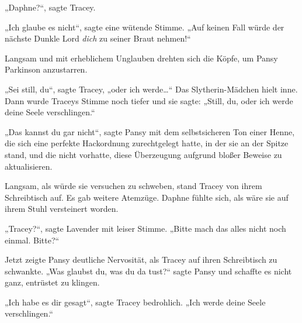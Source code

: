„Daphne?“, sagte Tracey.

„Ich glaube es nicht“, sagte eine wütende Stimme.
„Auf keinen Fall würde der nächste Dunkle Lord \emph{dich} zu seiner Braut nehmen!“

Langsam und mit erheblichem Unglauben drehten sich die Köpfe, um Pansy Parkinson anzustarren.

„Sei still, du“, sagte Tracey, „oder ich werde…“ Das Slytherin-Mädchen hielt inne. Dann wurde Traceys Stimme noch tiefer und sie sagte:
„Still, du, oder ich werde deine Seele verschlingen.“

„Das kannst du gar nicht“, sagte Pansy mit dem selbstsicheren Ton einer Henne, die sich eine perfekte Hackordnung zurechtgelegt hatte, in der sie an der Spitze stand, und die nicht vorhatte, diese Überzeugung aufgrund bloßer Beweise zu aktualisieren.

Langsam, als würde sie versuchen zu schweben, stand Tracey von ihrem Schreibtisch auf. Es gab weitere Atemzüge. Daphne fühlte sich, als wäre sie auf ihrem Stuhl versteinert worden.

„Tracey?“, sagte Lavender mit leiser Stimme.
„Bitte mach das alles nicht noch einmal. Bitte?“

Jetzt zeigte Pansy deutliche Nervosität, als Tracey auf ihren Schreibtisch zu schwankte.
„Was glaubst du, was du da tust?“ sagte Pansy und schaffte es nicht ganz, entrüstet zu klingen.

„Ich habe es dir gesagt“, sagte Tracey bedrohlich.
„Ich werde deine Seele verschlingen.“

